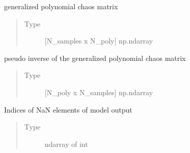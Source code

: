 \documentclass[letterpaper,10pt,english,openany,oneside]{sphinxmanual}
\begin{document}
\begin{fulllineitems}
\begin{fulllineitems}
\end{fulllineitems}


\begin{fulllineitems}
\label{\detokenize{pygpc:pygpc.GPC.GPC.gpc_matrix}}
generalized polynomial chaos matrix
\begin{quote}\begin{description}
\item[{Type}] \leavevmode
{[}N\_samples x N\_poly{]} np.ndarray

\end{description}\end{quote}

\end{fulllineitems}


\begin{fulllineitems}
\label{\detokenize{pygpc:pygpc.GPC.GPC.gpc_matrix_inv}}
pseudo inverse of the generalized polynomial chaos matrix
\begin{quote}\begin{description}
\item[{Type}] \leavevmode
{[}N\_poly x N\_samples{]} np.ndarray

\end{description}\end{quote}

\end{fulllineitems}


\begin{fulllineitems}
\label{\detokenize{pygpc:pygpc.GPC.GPC.nan_elm}}
Indices of NaN elements of model output
\begin{quote}\begin{description}
\item[{Type}] \leavevmode
ndarray of int

\end{description}\end{quote}

\end{fulllineitems}



\end{fulllineitems}
\end{document}
